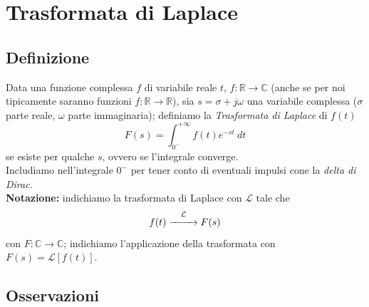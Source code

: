 \documentclass{article}
\numberwithin{equation}{subsection}
\let\oldsection\section%
\renewcommand{\section}{%
  \renewcommand{\theequation}{\thesection.\arabic{equation}}%
  \oldsection}%
\let\oldsubsection\subsection%
\renewcommand{\subsection}{%
  \renewcommand{\theequation}{\thesubsection.\arabic{equation}}%
  \oldsubsection}%
\begin{document}
\section{Trasformata di Laplace}
\subsection{Definizione}
Data una funzione complessa $f$ di variabile reale $t$, $f: \mathbb{R} \rightarrow \mathbb{C}$ (anche se per noi tipicamente saranno funzioni $f: \mathbb{R} \rightarrow \mathbb{R}$), sia $s = \sigma + j \omega$ una variabile complessa ($\sigma$ parte reale, $\omega$ parte immaginaria); definiamo la \textit{Trasformata di Laplace} di $f(t)$
\begin{equation}
    F(s) = \int_{0^-}^{+ \infty} f(t) e^{-st} \ dt
\end{equation}
se esiste per qualche $s$, ovvero se l'integrale converge.\\
Includiamo nell'integrale $0^{-}$ per tener conto di eventuali impulsi cone la \textit{delta di Dirac}.
\vspace*{0.2cm}\\
\textbf{Notazione:} indichiamo la trasformata di Laplace con $\mathcal{L}$ tale che
\begin{equation}
    f(t) \overset{\mathcal{L}}{\xrightarrow{\hspace*{0.8cm}}} F(s)
\end{equation}
con $F:\mathbb{C} \rightarrow \mathbb{C}$; indichiamo l'applicazione della trasformata con $F(s) = \mathcal{L}[f(t)]$.


\subsection{Osservazioni}
\end{document}

